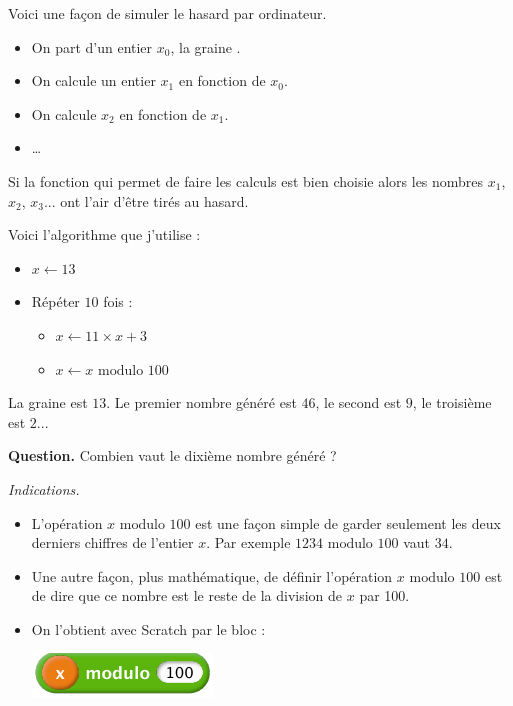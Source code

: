 \documentclass[class=report,crop=false, 12pt]{standalone}
\begin{document}
\begin{enigme}

Voici une façon de simuler le hasard par ordinateur.

\begin{itemize}
  \item On part d'un entier $x_0$, la \og graine \fg{}.
  \item On calcule un entier $x_1$ en fonction de $x_0$.
  \item On calcule $x_2$ en fonction de $x_1$.
  \item \ldots
\end{itemize}

Si la fonction qui permet de faire les calculs est bien choisie alors les nombres $x_1$, $x_2$, $x_3$... ont l'air d'être tirés au hasard.

Voici l'algorithme que j'utilise :
\begin{itemize}
  \item $x \leftarrow 13$
  \item Répéter $10$ fois :
  \begin{itemize}
    \item $x \leftarrow 11 \times x + 3$
    \item $x \leftarrow x \text{ modulo } 100$
  \end{itemize}
\end{itemize}  

\bigskip

La graine est $13$. Le premier nombre généré est $46$, le second est
$9$, le troisième est $2$... 

\textbf{Question.} Combien vaut le dixième nombre généré ?

\bigskip

\emph{Indications.}
\begin{itemize}
  \item L'opération \og $x \text{ modulo } 100$ \fg{} est une façon simple de garder seulement les deux derniers chiffres de l'entier $x$. Par exemple \og $1234 \text{ modulo } 100$  \fg{} vaut $34$.
  \item Une autre façon, plus mathématique, de définir l'opération \og $x \text{ modulo } 100$ \fg{} est de dire que ce nombre est le reste de la division de $x$ par 100.
  \item On l'obtient avec Scratch par le bloc :
\begin{center}
  \includegraphics[scale=\scalebloc]{bloc-06-eg2} 
\end{center}  
\end{itemize}



\end{enigme}
\end{document}
